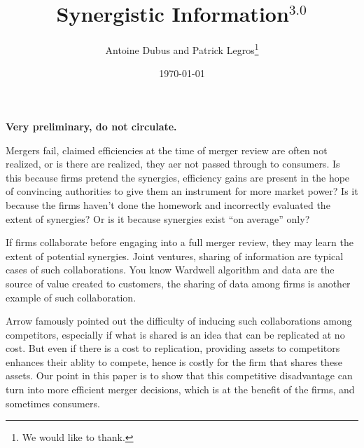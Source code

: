 \documentclass[a4paper,leqno]{article}%
\begin{document}
\title{Synergistic Information$^{3.0}$}
\author{Antoine Dubus and Patrick Legros\thanks{We would like to thank.}}
\date{\today}


\maketitle

 
\textbf{Very preliminary, do not circulate.}

\baselineskip0.7cm
Mergers fail, claimed efficiencies at the time of merger review are often not realized, or is there are realized, they aer not passed through to consumers. Is this because firms pretend the synergies, efficiency gains are present in the hope of convincing authorities to give them an instrument for more market power? Is it because the firms haven't done the homework and incorrectly evaluated the extent of synergies? Or is it because synergies exist ``on average'' only?

If firms collaborate before engaging into a full merger review, they may learn the extent of potential synergies. Joint ventures, sharing of information are typical cases of such collaborations. You know Wardwell algorithm and data are the source of value created to customers, the sharing of data among firms is another example of such collaboration.

Arrow famously pointed out the difficulty of inducing such collaborations among competitors, especially if what is shared is an idea that can be replicated at no cost. But even if there is a cost to replication, providing assets to competitors enhances their ablity to compete, hence is costly for the firm that shares these assets. Our point in this paper is to show that this competitive disadvantage can turn into more efficient merger decisions, which is at the benefit of the firms, and sometimes consumers.
\end{document}
